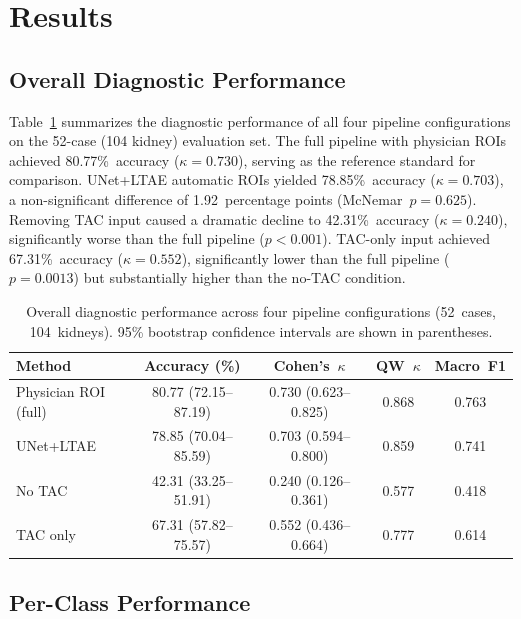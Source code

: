 \documentclass[sn-basic]{sn-jnl}
\begin{document}
\section{Results}
\label{sec:results}

\subsection{Overall Diagnostic Performance}

Table~\ref{tab:overall} summarizes the diagnostic performance
of all four pipeline configurations on the 52-case (104
kidney) evaluation set.  The full pipeline with physician
ROIs achieved 80.77\%~accuracy ($\kappa=0.730$), serving as
the reference standard for comparison.  UNet+LTAE automatic
ROIs yielded 78.85\%~accuracy ($\kappa=0.703$), a
non-significant difference of 1.92~percentage points
(McNemar~$p=0.625$).  Removing TAC input caused a dramatic
decline to 42.31\%~accuracy ($\kappa=0.240$), significantly
worse than the full pipeline ($p<0.001$).  TAC-only input
achieved 67.31\%~accuracy ($\kappa=0.552$), significantly
lower than the full pipeline ($p=0.0013$) but substantially
higher than the no-TAC condition.

\begin{table}[t]
  \centering
  \caption{Overall diagnostic performance across four
    pipeline configurations (52~cases, 104~kidneys).  95\%
    bootstrap confidence intervals are shown in parentheses.}
  \label{tab:overall}
  \small
  \begin{threeparttable}
    \begin{tabular}{lcccc}
      \toprule
      Method & Accuracy (\%) & Cohen's~$\kappa$ & QW~$\kappa$ & Macro~F1 \\
      \midrule
      Physician ROI (full) & 80.77 (72.15--87.19) & 0.730 (0.623--0.825) & 0.868 & 0.763 \\
      UNet+LTAE & 78.85 (70.04--85.59) & 0.703 (0.594--0.800) & 0.859 & 0.741 \\
      No TAC & 42.31 (33.25--51.91) & 0.240 (0.126--0.361) & 0.577 & 0.418 \\
      TAC only & 67.31 (57.82--75.57) & 0.552 (0.436--0.664) & 0.777 & 0.614 \\
      \bottomrule
    \end{tabular}
  \end{threeparttable}
\end{table}

\subsection{Per-Class Performance}
\end{document}
